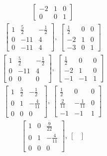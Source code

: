 \documentclass[12pt]{article}
\begin{document}
\begin{enumerate}
\begin{align*}
\begin{bmatrix}
        -2 & 1 & 0\\
        0 & 0 & 1
      \end{bmatrix}
    \end{align*}
    \begin{align*}
      \begin{bmatrix}
        1 & \frac{5}{2} & -\frac{1}{2}\\
        0 & -11 & 4\\
        0 & -11 & 4
      \end{bmatrix},\
      \begin{bmatrix}
        \frac{1}{2} & 0 & 0\\
        -2 & 1 & 0\\
        -3 & 0 & 1
      \end{bmatrix}
    \end{align*}
    \begin{align*}
      \begin{bmatrix}
        1 & \frac{5}{2} & -\frac{1}{2}\\
        0 & -11 & 4\\
        0 & 0 & 0
      \end{bmatrix},\
      \begin{bmatrix}
        \frac{1}{2} & 0 & 0\\
        -2 & 1 & 0\\
        -1 & -1 & 1
      \end{bmatrix}
    \end{align*}
    \begin{align*}
      \begin{bmatrix}
        1 & \frac{5}{2} & -\frac{1}{2}\\
        0 & 1 & -\frac{4}{11}\\
        0 & 0 & 0
      \end{bmatrix},\
      \begin{bmatrix}
        \frac{1}{2} & 0 & 0\\
        \frac{2}{11} & -\frac{1}{11} & 0\\
        -1 & -1 & 1
      \end{bmatrix}
    \end{align*}
    \begin{align*}
      \begin{bmatrix}
        1 & 0 & \frac{9}{22}\\
        0 & 1 & -\frac{4}{11}\\
        0 & 0 & 0
      \end{bmatrix},\
      \begin{bmatrix}

\end{bmatrix}
\end{align*}
\end{enumerate}
\end{document}
